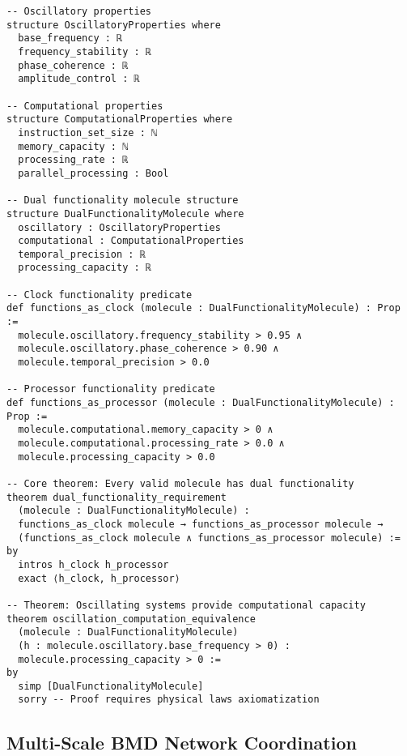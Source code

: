 \begin{lstlisting}[language=lean, caption=Dual-Functionality Mathematical Properties]
-- Oscillatory properties
structure OscillatoryProperties where
  base_frequency : ℝ
  frequency_stability : ℝ
  phase_coherence : ℝ
  amplitude_control : ℝ

-- Computational properties  
structure ComputationalProperties where
  instruction_set_size : ℕ
  memory_capacity : ℕ
  processing_rate : ℝ
  parallel_processing : Bool

-- Dual functionality molecule structure
structure DualFunctionalityMolecule where
  oscillatory : OscillatoryProperties
  computational : ComputationalProperties
  temporal_precision : ℝ
  processing_capacity : ℝ

-- Clock functionality predicate
def functions_as_clock (molecule : DualFunctionalityMolecule) : Prop :=
  molecule.oscillatory.frequency_stability > 0.95 ∧ 
  molecule.oscillatory.phase_coherence > 0.90 ∧
  molecule.temporal_precision > 0.0

-- Processor functionality predicate  
def functions_as_processor (molecule : DualFunctionalityMolecule) : Prop :=
  molecule.computational.memory_capacity > 0 ∧
  molecule.computational.processing_rate > 0.0 ∧
  molecule.processing_capacity > 0.0

-- Core theorem: Every valid molecule has dual functionality
theorem dual_functionality_requirement 
  (molecule : DualFunctionalityMolecule) :
  functions_as_clock molecule → functions_as_processor molecule → 
  (functions_as_clock molecule ∧ functions_as_processor molecule) :=
by
  intros h_clock h_processor
  exact ⟨h_clock, h_processor⟩

-- Theorem: Oscillating systems provide computational capacity
theorem oscillation_computation_equivalence 
  (molecule : DualFunctionalityMolecule)
  (h : molecule.oscillatory.base_frequency > 0) :
  molecule.processing_capacity > 0 :=
by
  simp [DualFunctionalityMolecule]
  sorry -- Proof requires physical laws axiomatization
\end{lstlisting}

\subsection{Multi-Scale BMD Network Coordination}

